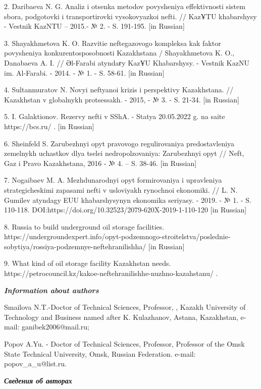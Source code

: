 2. Daribaeva N. G. Analiz i otsenka metodov povysheniya effektivnosti
sistem sbora, podgotovki i transportirovki vysokovyazkoi nefti. //
KazҰTU khabarshysy - Vestnik KazNTU -- 2015.- № 2. - S. 191-195. {[}in
Russian{]}

3. Shayakhmetova K. O. Razvitie neftegazovogo kompleksa kak faktor
povysheniya konkurentosposobnosti Kazakhstana / Shayakhmetova K. O.,
Danabaeva A. I. // Әl-Farabi atyndaғy KazҰU Khabarshysy. - Vestnik KazNU
im. Al\textquotesingle-Farabi. - 2014. - № 1. - S. 58-61. {[}in
Russian{]}

4. Sultanmuratov N. Novyi neftyanoi krizis i perspektivy Kazakhstana. //
Kazakhstan v global\textquotesingle nykh protsessakh. - 2015, - № 3. -
S. 21-34. {[}in Russian{]}

5. I. Galaktionov. Rezervy nefti v SShA. - Stat\textquotesingle ya
20.05.2022 g. na saite https://bcs.ru/ . {[}in Russian{]}

6. Sheinfel\textquotesingle d S. Zarubezhnyi opyt pravovogo
regulirovaniya predostavleniya zemel\textquotesingle nykh uchastkov dlya
tselei nedropol\textquotesingle zovaniya: Zarubezhnyi opyt //
Neft\textquotesingle, Gaz i Pravo Kazakhstana, 2016 - № 4. -- S. 38-46.
{[}in Russian{]}

7. Nogaibaev M. A. Mezhdunarodnyi opyt formirovaniya i upravleniya
strategicheskimi zapasami nefti v usloviyakh rynochnoi ekonomiki. // L.
N. Gumilev atyndagy EUU khabarshysynyn ekonomika seriyasy. - 2019. - №
1. - S. 110-118. DOI:https://doi.org/10.32523/2079-620X-2019-1-110-120
{[}in Russian{]}

8. Russia to build underground oil storage facilities.
https://undergroundexpert.info/opyt-podzemnogo-stroitelstva/poslednie-sobytiya/rossiya-podzemnye-neftehranilishha/
{[}in Russian{]}

9. What kind of oil storage facility Kazakhstan needs.
https://petrocouncil.kz/kakoe-neftehranilishhe-nuzhno-kazahstanu/ .

\emph{{\bfseries Information about authors}}

Smailova N.T.-Doctor of Technical Sciences, Professor, , Kazakh
University of Technology and Business named after K. Kulazhanov, Astana,
Kazakhstan, e-mail: ganibek2006@mail.ru;

Popov A.Yu. - Doctor of Technical Sciences, Professor, Professor of the
Omsk State Technical University, Omsk, Russian Federation. e-mail:
popov\_a\_u@list.ru.

\emph{{\bfseries Сведения об авторах}}

